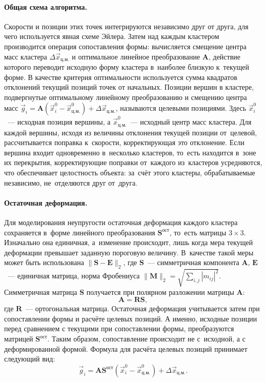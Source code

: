 \documentclass[a4paper, 14pt, titlepage]{extarticle}
\newcommand{\vect}[1]{\vec{#1}} %
\newcommand{\matx}[1]{\mathbf{#1}} %
\begin{document}
        \paragraph{Общая схема алгоритма.} Скорости и позиции этих точек интегрируются независимо
        друг от друга, для чего используется явная схеме Эйлера. Затем над каждым кластером
        производится операция сопоставления формы: вычисляется смещение центра масс кластера
        $\Delta \vect{x}_{ц.м.}$ и оптимальное линейное преобразование $\matx A$, действие которого
        переводит исходную форму кластера в~наиболее близкую к~текущей форме. В качестве критерия
        оптимальности используется сумма квадратов отклонений текущий позиций точек от начальных. Позиции
        вершин в кластере, подвергнутые оптимальному линейному преобразованию и смещению центра масс
        $\vect{g}_i = \matx{A} (\vect{x}^0_i - \vect{x}^0_{ц.м.}) + \Delta \vect{x}_{ц.м.}$,
        называются целевыми позициями. Здесь $\vect{x}^0_i$~--- исходная позиция вершины, а
        $\vect{x}^0_{ц.м.}$~--- исходный центр масс кластера. Для каждой вершины, исходя из величины
        отклонения текущей позиции от~целевой, рассчитывается поправка к~скорости, корректирующая
        это отклонение. Если вершина входит одновременно в~несколько кластеров, то~есть находится
        в~зоне их перекрытия, корректирующие поправки от~каждого из~кластеров усредняются, что
        обеспечивает целостность объекта: за~счёт этого кластеры, обрабатываемые независимо,
        не~отделяются друг от~друга.

        \paragraph{Остаточная деформация.} Для моделирования неупругости остаточная деформация
        каждого кластера сохраняется в~форме линейного преобразования $\matx{S}^{ост}$, то~есть
        матрицы $3 \times 3$. Изначально она единичная, а~изменение происходит, лишь когда мера
        текущей деформации превышает заданную пороговую величину. В~качестве такой меры может быть
        использована $ \|\matx S - \matx E\|_2 $, где $\matx S$~--- симметричная компонента $\matx
        A$, $\matx E$~--- единичная матрица, норма Фробениуса $\|\matx M\|_2 = \sqrt{\sum_{i, j} |m_{ij}|^2}$.
        Симметричная матрица $\matx S$ получается при полярном разложении матрицы $\matx A$:
        \begin{equation}\label{eq:polar_decomposition}
          \matx A = \matx R \matx S,
        \end{equation}
        где $\matx R$~--- ортогональная матрица. Остаточная деформация учитывается затем при
        сопоставлении формы и расчёте целевых позиций. А именно, исходные позиции перед сравнением
        с текущими при сопоставлении формы, преобразуются матрицей $\matx{S}^{ост}$. Таким
        образом, сопоставление происходит не с~исходной, а с деформированной формой. Формула для
        расчёта целевых позиций принимает следующий вид:
        \begin{equation}\label{eq:goal_pos}
          \vect{g}_i = \matx{A} \matx{S}^{ост} (\vect{x}^0_i - \vect{x}^0_{ц.м.}) + \Delta \vect{x}_{ц.м.}.
        \end{equation}
\end{document}
